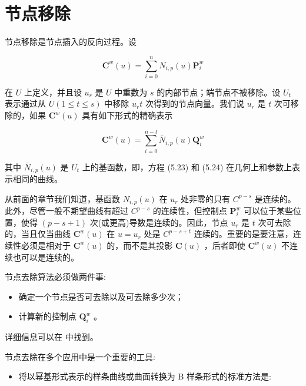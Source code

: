\documentclass[../main.tex]{subfiles}
\begin{document}
\section{节点移除}

节点移除是节点插入的反向过程。设

\[
{\mathbf{C}}^{w}\left( u\right)  = \mathop{\sum }\limits_{{i = 0}}^{n}{N}_{i,p}\left( u\right) {\mathbf{P}}_{i}^{w} \tag{5.23}
\]

在 \(U\) 上定义，并且设 \({u}_{r}\) 是 \(U\) 中重数为 \(s\) 的内部节点；端节点不被移除。设 \({U}_{t}\) 表示通过从 \(U\left( {1 \leq  t \leq  s}\right)\) 中移除 \({u}_{r}t\) 次得到的节点向量。我们说 \({u}_{r}\) 是 \(t\) 次可移除的，如果 \({\mathbf{C}}^{w}\left( u\right)\) 具有如下形式的精确表示

\[
{\mathbf{C}}^{w}\left( u\right)  = \mathop{\sum }\limits_{{i = 0}}^{{n - t}}{\bar{N}}_{i,p}\left( u\right) {\mathbf{Q}}_{i}^{w} \tag{5.24}
\]

其中 \({\bar{N}}_{i,p}\left( u\right)\) 是 \({U}_{t}\) 上的基函数，即，方程 (5.23) 和 (5.24) 在几何上和参数上表示相同的曲线。



从前面的章节我们知道，基函数 \({N}_{i,p}\left( u\right)\) 在 \({u}_{r}\) 处非零的只有 \({C}^{p - s}\) 是连续的。此外，尽管一般不期望曲线有超过 \({C}^{p - s}\) 的连续性，但控制点 \({\mathbf{P}}_{i}^{w}\) 可以位于某些位置，使得 \(\left( {p - s + 1}\right)\) 次(或更高)导数是连续的。因此，节点 \({u}_{r}\) 是 \(t\) 次可去除的，当且仅当曲线 \({\mathbf{C}}^{w}\left( u\right)\) 在 \(u = {u}_{r}\) 处是 \({C}^{p - s + t}\) 连续的。重要的是要注意，连续性必须是相对于 \({\mathbf{C}}^{w}\left( u\right)\) 的，而不是其投影 \(\mathbf{C}\left( u\right)\) ，后者即使 \({\mathbf{C}}^{w}\left( u\right)\) 不连续也可以是连续的。

节点去除算法必须做两件事:

\begin{itemize}
\item 确定一个节点是否可去除以及可去除多少次；
\end{itemize}

\begin{itemize}
\item 计算新的控制点 \({\mathbf{Q}}_{i}^{w}\) 。
\end{itemize}

详细信息可以在 \cite{Till92} 中找到。

节点去除在多个应用中是一个重要的工具:

\begin{itemize}
\item 将以幂基形式表示的样条曲线或曲面转换为 B 样条形式的标准方法是:
\end{itemize}
\end{document}
